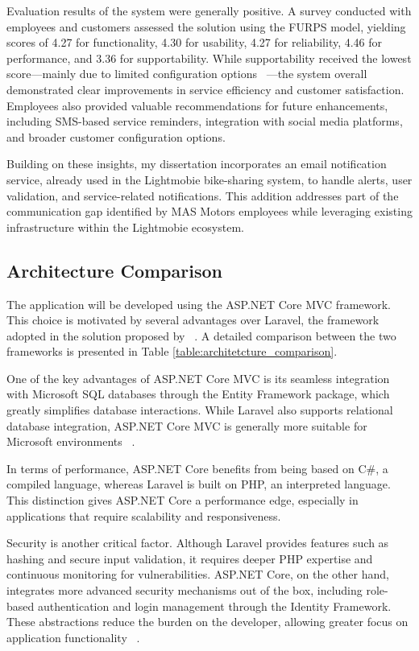 Evaluation results of the system were generally positive. A survey conducted with employees and customers assessed the solution using the \ac{FURPS} model, yielding scores of 4.27 for functionality, 4.30 for usability, 4.27 for reliability, 4.46 for performance, and 3.36 for supportability. While supportability received the lowest score—mainly due to limited configuration options ~\cite{MAS_MOTORS}—the system overall demonstrated clear improvements in service efficiency and customer satisfaction. Employees also provided valuable recommendations for future enhancements, including SMS-based service reminders, integration with social media platforms, and broader customer configuration options.

Building on these insights, my dissertation incorporates an email notification service, already used in the Lightmobie bike-sharing system, to handle alerts, user validation, and service-related notifications. This addition addresses part of the communication gap identified by MAS Motors employees while leveraging existing infrastructure within the Lightmobie ecosystem.

\subsection{Architecture Comparison}
  
The application will be developed using the ASP.NET Core MVC framework. This choice is motivated by several advantages over Laravel, the framework adopted in the solution proposed by ~\citet{MAS_MOTORS}. A detailed comparison between the two frameworks is presented in Table \ref{table:architetcture_comparison}.

One of the key advantages of ASP.NET Core MVC is its seamless integration with Microsoft SQL databases through the Entity Framework package, which greatly simplifies database interactions. While Laravel also supports relational database integration, ASP.NET Core MVC is generally more suitable for Microsoft environments ~\cite{asp_net_vs_laravel}.

In terms of performance, ASP.NET Core benefits from being based on C\#, a compiled language, whereas Laravel is built on PHP, an interpreted language. This distinction gives ASP.NET Core a performance edge, especially in applications that require scalability and responsiveness.

Security is another critical factor. Although Laravel provides features such as hashing and secure input validation, it requires deeper PHP expertise and continuous monitoring for vulnerabilities. ASP.NET Core, on the other hand, integrates more advanced security mechanisms out of the box, including role-based authentication and login management through the Identity Framework. These abstractions reduce the burden on the developer, allowing greater focus on application functionality ~\cite{asp_net_vs_laravel}.

